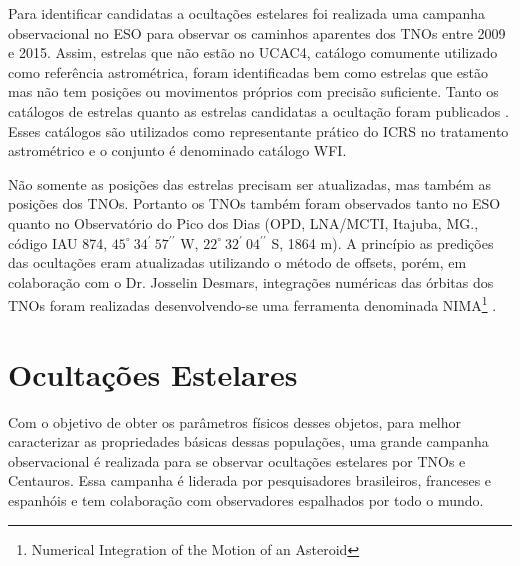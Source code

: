 \documentclass[12pt,a4paper]{report}
\newcommand{\arcmin}{\ensuremath{^{\prime}}}%
\newcommand{\arcsec}{\ensuremath{^{\prime\prime}}}%
\begin{document}
Para identificar candidatas a ocultações estelares foi realizada uma campanha observacional no ESO para observar os caminhos aparentes dos TNOs entre 2009 e 2015. Assim, estrelas que não estão no UCAC4, catálogo comumente utilizado como referência astrométrica, foram identificadas bem como estrelas que estão mas não tem posições ou movimentos próprios com precisão suficiente. Tanto os catálogos de estrelas quanto as estrelas candidatas a ocultação foram publicados \citep{Assafin2010, Assafin2012, Camargo2013}. Esses catálogos são utilizados como representante prático do ICRS no tratamento astrométrico e o conjunto é denominado catálogo WFI.

Não somente as posições das estrelas precisam ser atualizadas, mas também as posições dos TNOs. Portanto os TNOs também foram observados tanto no ESO quanto no Observatório do Pico dos Dias (OPD, LNA/MCTI, Itajuba, MG., código IAU 874, $45^{\circ} ~34\arcmin ~57\arcsec$ W, $22^{\circ} ~32\arcmin ~04\arcsec$ S, 1864 m). A princípio as predições das ocultações eram atualizadas utilizando o método de offsets, porém, em colaboração com o Dr. Josselin Desmars, integrações numéricas das órbitas dos TNOs foram realizadas desenvolvendo-se uma ferramenta denominada NIMA\footnote{Numerical Integration of the Motion of an Asteroid} \citep[aceito]{Desmars2015}.


\section{Ocultações Estelares}
\label{Sec: TNO-occ}

\indent \indent Com o objetivo de obter os parâmetros físicos desses objetos, para melhor caracterizar as propriedades básicas dessas populações, uma grande campanha observacional é realizada para se observar ocultações estelares por TNOs e Centauros. Essa campanha é liderada por pesquisadores brasileiros, franceses e espanhóis e tem colaboração com observadores espalhados por todo o mundo.
\end{document}
